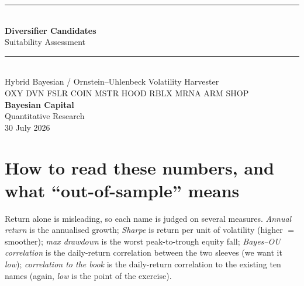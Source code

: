 \documentclass[11pt]{article}
\begin{document}
\begin{titlepage}
\vspace*{1.2cm}
{\color{bcgold}\rule{\textwidth}{2pt}}\\[0.4cm]
{\color{bcnavy}\Huge\bfseries Diversifier Candidates}\\[0.35cm]
{\color{bcblue}\LARGE Suitability Assessment}\\[0.5cm]
{\color{bcgold}\rule{\textwidth}{1pt}}\\[0.6cm]
{\large\color{bcgrey} Hybrid Bayesian / Ornstein--Uhlenbeck Volatility Harvester}\\[0.2cm]
{\large\color{bcgrey} OXY \enskip DVN \enskip FSLR \enskip COIN \enskip MSTR \enskip HOOD
 \enskip RBLX \enskip MRNA \enskip ARM \enskip SHOP}\\[1.2cm]
{\color{bcnavy}\large\bfseries Bayesian Capital}\\[0.15cm]
{\color{bcgrey} Quantitative Research}\\[0.15cm]
{\color{bcgrey} 30 July 2026}\\[2cm]

\end{titlepage}

\section{How to read these numbers, and what ``out-of-sample'' means}

Return alone is misleading, so each name is judged on several measures. \emph{Annual return}
is the annualised growth; \emph{Sharpe} is return per unit of volatility (higher $=$ smoother);
\emph{max drawdown} is the worst peak-to-trough equity fall; \emph{Bayes--OU correlation} is the
daily-return correlation between the two sleeves (we want it \emph{low}); \emph{correlation to
the book} is the daily-return correlation to the existing ten names (again, \emph{low} is the
point of the exercise).
\end{document}
